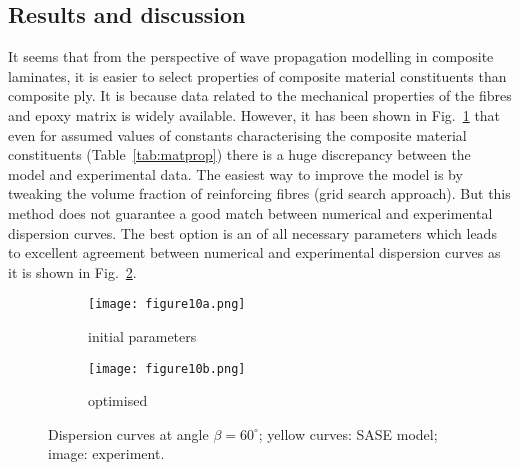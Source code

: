 \subsection{Results and discussion}
It seems that from the perspective of wave propagation modelling in composite laminates, it is easier to select properties of composite material constituents than composite ply. It is because data related to the mechanical properties of the fibres and epoxy matrix is widely available. However, it has been shown in Fig.~\ref{fig:dispersion60deg_initial} that even for   assumed values of constants characterising the composite material constituents (Table~\ref{tab:matprop}) there is a huge discrepancy between the model and experimental data. The easiest way to improve the model is by tweaking the volume fraction of reinforcing fibres (grid search approach). But this method does not guarantee a good match between numerical and experimental dispersion curves. The best option is an 
  of all necessary parameters  which leads to excellent agreement between numerical and experimental dispersion curves as it is shown in Fig.~\ref{fig:dispersion60deg}. 
	
\begin{figure} [h!]
		\centering
		\begin{subfigure}[b]{0.49\textwidth}
			\centering
														  \texttt{[image: figure10a.png]}
			
\caption{initial parameters}
			\label{fig:dispersion60deg_initial}
		\end{subfigure}
		\begin{subfigure}[b]{0.49\textwidth}
			\centering
															\texttt{[image: figure10b.png]}
			
\caption{optimised}
			\label{fig:dispersion60deg}
		\end{subfigure}
	
\caption{Dispersion curves at angle \(\beta = 60^{\circ}\); yellow curves: SASE 
	model; 
	image: experiment. }

	\label{fig:initial_optimized}
	\end{figure}
 
